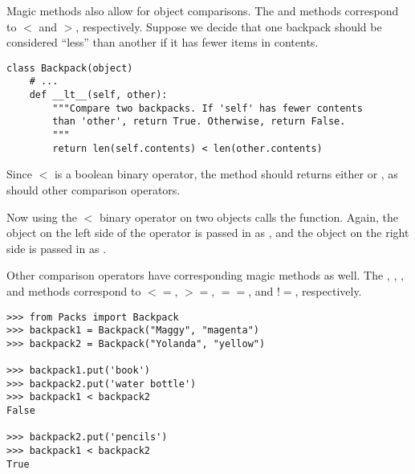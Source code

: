 Magic methods also allow for object comparisons.
The  and  methods correspond to $<$ and $>$, respectively.
Suppose we decide that one backpack should be considered ``less'' than another if it has fewer items in contents.

\begin{lstlisting}
class Backpack(object)
    # ...
    def __lt__(self, other):
        """Compare two backpacks. If 'self' has fewer contents
        than 'other', return True. Otherwise, return False.
        """
        return len(self.contents) < len(other.contents)
\end{lstlisting}


Since $<$ is a boolean binary operator, the  method should returns either  or , as should other comparison operators.

Now using the $<$ binary operator on two  objects calls the  function.
Again, the object on the left side of the operator is passed in as , and the object on the right side is passed in as .

Other comparison operators have corresponding magic methods as well.
The , , , and  methods correspond to $<=$, $>=$, $==$, and $!=$, respectively.

\begin{lstlisting}
>>> from Packs import Backpack
>>> backpack1 = Backpack("Maggy", "magenta")
>>> backpack2 = Backpack("Yolanda", "yellow")

>>> backpack1.put('book')
>>> backpack2.put('water bottle')
>>> backpack1 < backpack2
False

>>> backpack2.put('pencils')
>>> backpack1 < backpack2
True
\end{lstlisting}

